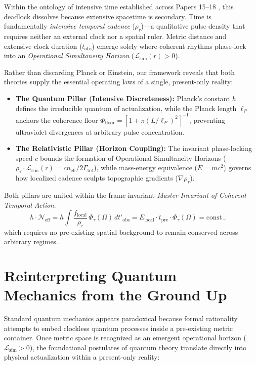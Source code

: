 \documentclass[11pt,a4paper]{article}
\begin{document}
Within the ontology of intensive time established across Papers 15--18 \cite{DamasioP15,DamasioP16,DamasioP17,DamasioP18}, this deadlock dissolves because extensive spacetime is secondary. Time is fundamentally \emph{intensive temporal cadence} ($\rho_\tau$)---a qualitative pulse density that requires neither an external clock nor a spatial ruler. Metric distance and extensive clock duration ($t_{\mathrm{obs}}$) emerge solely where coherent rhythms phase-lock into an \emph{Operational Simultaneity Horizon} ($\mathcal{L}_{\mathrm{sim}}(r) > 0$).

Rather than discarding Planck or Einstein, our framework reveals that both theories supply the essential operating laws of a single, present-only reality:
\begin{itemize}
    \item \textbf{The Quantum Pillar (Intensive Discreteness):} Planck's constant $h$ defines the irreducible quantum of actualization, while the Planck length $\ell_P$ anchors the coherence floor $\Phi_{\mathrm{floor}} = [1 + \pi(L/\ell_P)^2]^{-1}$, preventing ultraviolet divergences at arbitrary pulse concentration.
    \item \textbf{The Relativistic Pillar (Horizon Coupling):} The invariant phase-locking speed $c$ bounds the formation of Operational Simultaneity Horizons ($\rho_\tau \cdot \mathcal{L}_{\mathrm{sim}}(r) = c n_{\mathrm{eff}} / 2\Gamma_{\mathrm{tot}}$), while mass-energy equivalence ($E = mc^2$) governs how localized cadence sculpts topographic gradients ($\nabla \rho_\tau$).
\end{itemize}

Both pillars are united within the frame-invariant \emph{Master Invariant of Coherent Temporal Action}:
\begin{equation}
h \cdot \mathcal{N}_{\mathrm{eff}} = h \int \frac{f_{\mathrm{local}}}{\rho_\tau} \, \Phi_\tau(\Omega) \, dt'_{\mathrm{obs}} = E_{\mathrm{local}} \cdot t_{\mathrm{pre}} \cdot \Phi_\tau(\Omega) = \mathrm{const.},
\end{equation}
which requires no pre-existing spatial background to remain conserved across arbitrary regimes.

\section{Reinterpreting Quantum Mechanics from the Ground Up}

Standard quantum mechanics appears paradoxical because formal rationality attempts to embed clockless quantum processes inside a pre-existing metric container. Once metric space is recognized as an emergent operational horizon ($\mathcal{L}_{\mathrm{sim}} > 0$), the foundational postulates of quantum theory translate directly into physical actualization within a present-only reality:
\end{document}
